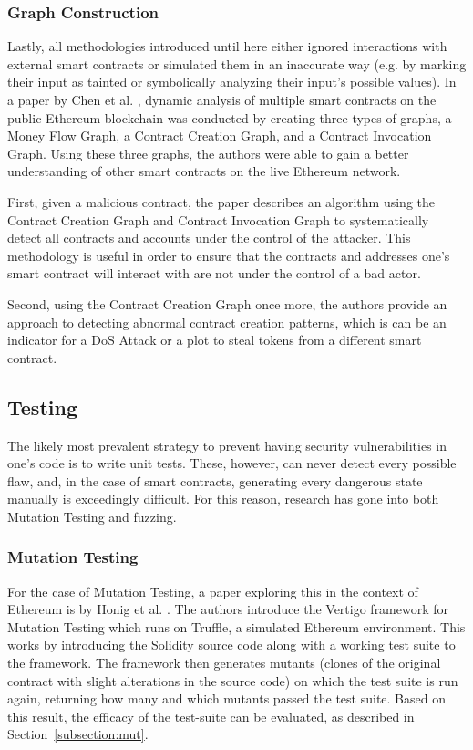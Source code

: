 \documentclass[letterpaper,twocolumn,10pt]{article}
\begin{document}
\subsubsection{Graph Construction}
Lastly, all methodologies introduced until here either ignored interactions with external smart contracts or simulated them in an inaccurate way (e.g. by marking their input as tainted or symbolically analyzing their input's possible values). In a paper by Chen et al. \cite{chen_zhu_li_chen_li_luo_lin_zhange_2018}, dynamic analysis of multiple smart contracts on the public Ethereum blockchain was conducted by creating three types of graphs, a Money Flow Graph, a Contract Creation Graph, and a Contract Invocation Graph. Using these three graphs, the authors were able to gain a better understanding of other smart contracts on the live Ethereum network.

\noindent First, given a malicious contract, the paper describes an algorithm using the Contract Creation Graph and Contract Invocation Graph to systematically detect all contracts and accounts under the control of the attacker. This methodology is useful in order to ensure that the contracts and addresses one's smart contract will interact with are not under the control of a bad actor.

\noindent Second, using the Contract Creation Graph once more, the authors provide an approach to detecting abnormal contract creation patterns, which is can be an indicator for a DoS Attack or a plot to steal tokens from a different smart contract.


\subsection{Testing}
The likely most prevalent strategy to prevent having security vulnerabilities in one's code is to write unit tests. These, however, can never detect every possible flaw, and, in the case of smart contracts, generating every dangerous state manually is exceedingly difficult. For this reason, research has gone into both Mutation Testing and fuzzing.


\subsubsection{Mutation Testing}

\noindent For the case of Mutation Testing, a paper exploring this in the context of Ethereum is by Honig et al. \cite{honig_everts_huisman_2019}. The authors introduce the Vertigo framework for Mutation Testing which runs on Truffle, a simulated Ethereum environment. This works by introducing the Solidity source code along with a working test suite to the framework. The framework then generates mutants (clones of the original contract with slight alterations in the source code) on which the test suite is run again, returning how many and which mutants passed the test suite. Based on this result, the efficacy of the test-suite can be evaluated, as described in Section~\ref{subsection:mut}.
\end{document}
